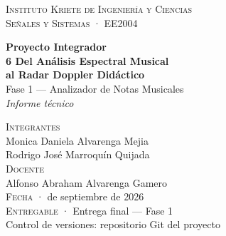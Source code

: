 \documentclass[12pt]{article}
\newcommand{\PlanRule}{\par\noindent{\color{KeyNavy}\rule{0.44\textwidth}{0.9pt}}\par}
\newcommand{\SmallCapsLabel}[1]{{\color{KeyGray}\large\textsc{#1}}}
\begin{document}

\begin{titlepage}
  \thispagestyle{empty}
  \centering
  \vspace*{0.65cm}

  {\color{KeyGray}\large\textsc{Instituto Kriete de Ingeniería y Ciencias}}\\[3pt]
  {\color{KeyGray}\large\textsc{Señales y Sistemas} \;·\; EE2004}\\[1.2cm]

  \PlanRule
  \vspace{0.9cm}

  {\color{KeyNavy}\fontsize{22}{26}\selectfont\bfseries Proyecto Integrador\\ [6pt] 6 Del Análisis Espectral Musical\\[6pt]
   al Radar Doppler Didáctico}\\ [15pt]

  {\color{KeyNavy}\fontsize{16}{20}\selectfont Fase 1 --- Analizador de Notas Musicales}\\[10pt]
  {\color{KeyGray}\large\itshape Informe técnico}\\[0.95cm]

  \PlanRule

  \vfill

  \SmallCapsLabel{Integrantes}\\[8pt]
  {\large Monica Daniela Alvarenga Mejia}\\[4pt]
  {\large Rodrigo José Marroquín Quijada}\\[0.8cm]

  \SmallCapsLabel{Docente}\\[8pt]
  {\large Alfonso Abraham Alvarenga Gamero}\\[0.75cm]

  {\large\color{KeyGray}\textsc{Fecha} \;· de septiembre de 2026}\\[7pt]
  {\large\color{KeyGray}\textsc{Entregable} \;·\; Entrega final --- Fase 1}\\[8pt]
  {\small\color{KeyGray}Control de versiones: repositorio Git del proyecto}

  \vspace*{0.45cm}
\end{titlepage}

\tableofcontents
\newpage
\end{document}
